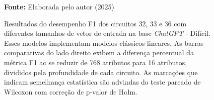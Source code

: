 \begin{figure}
\caption{Resultados do desempenho F1 dos circuitos 32, 33 e 36 com diferentes tamanhos de vetor de entrada na base \textit{ChatGPT} - Difícil. Esses modelos implementam modelos clássicos lineares. As barras comparativas do lado direito exibem a diferença percentual da métrica F1 ao se reduzir de 768 atributos para 16 atributos, divididos pela profundidade de cada circuito. As marcações que indicam semelhança estatística são advindas do teste pareado de Wilcoxon com correção de p-valor de Holm.}
\label{fig:n_features:hard:g4}
     \centering
    \centering
      \par\medskip\ABNTEXfontereduzida\selectfont\textbf{Fonte:} Elaborada pelo autor (2025) \par\medskip
\end{figure}